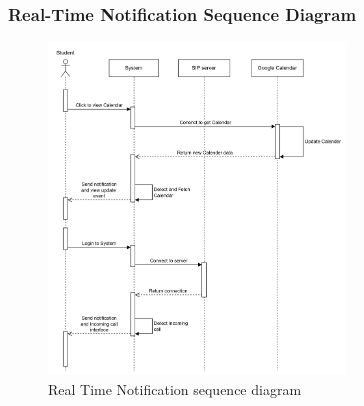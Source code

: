 \subsubsection{Real-Time Notification Sequence Diagram}
\begin{figure}[H]
    \centering
    \includegraphics[width=0.7\textwidth, height=0.6\textheight]{image/Real-timeNotificationSequence.png} 
    \caption{Real Time Notification sequence diagram}
    \label{fig:noti_sequence}
\end{figure}
